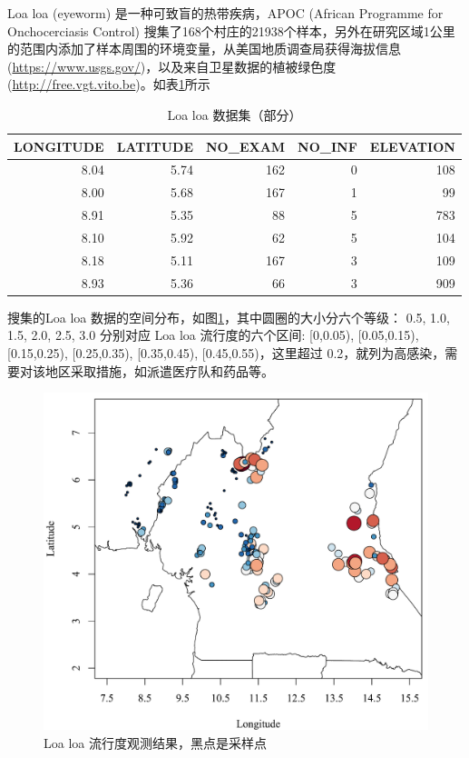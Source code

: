 \documentclass[hyperref, a4paper, UTF8, zihao = -4, linespread = 1.25, scheme = chinese]{ctexbook}
\begin{document}
Loa loa (eyeworm) 是一种可致盲的热带疾病，APOC (African Programme for
Onchocerciasis Control)
搜集了168个村庄的21938个样本，另外在研究区域1公里的范围内添加了样本周围的环境变量\citep{Thomson2004Mapping}，从美国地质调查局获得海拔信息(\url{https://www.usgs.gov/})，以及来自卫星数据的植被绿色度(\url{http://free.vgt.vito.be})。如表\ref{tab:loaloa-data}所示

\begin{longtable}[t]{rrrrr}
\caption{\label{tab:loaloa-data}Loa loa 数据集（部分）}\\
\toprule
LONGITUDE & LATITUDE & NO\_EXAM & NO\_INF & ELEVATION\\
\midrule
8.04 & 5.74 & 162 & 0 & 108\\
8.00 & 5.68 & 167 & 1 & 99\\
8.91 & 5.35 & 88 & 5 & 783\\
8.10 & 5.92 & 62 & 5 & 104\\
8.18 & 5.11 & 167 & 3 & 109\\
8.93 & 5.36 & 66 & 3 & 909\\
\bottomrule
\end{longtable}

搜集的Loa loa
数据的空间分布，如图\ref{fig:loaloa-ratio}，其中圆圈的大小分六个等级：
0.5, 1.0, 1.5, 2.0, 2.5, 3.0 分别对应 Loa loa 流行度的六个区间:
{[}0,0.05), {[}0.05,0.15), {[}0.15,0.25), {[}0.25,0.35), {[}0.35,0.45),
{[}0.45,0.55)，这里超过
0.2，就列为高感染，需要对该地区采取措施，如派遣医疗队和药品等。

\begin{figure}

{\centering \includegraphics[width=0.6\linewidth]{figures/loaloa-map} 

}

\caption{Loa loa 流行度观测结果，黑点是采样点}\label{fig:loaloa-ratio}
\end{figure}
\end{document}
